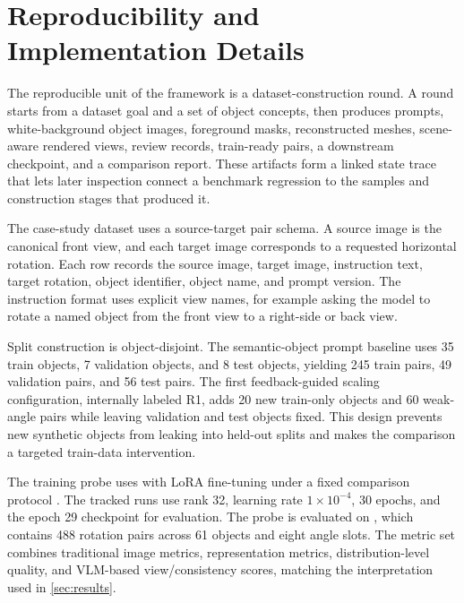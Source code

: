 \section{Reproducibility and Implementation Details}
\label{app:reproducibility}

The reproducible unit of the framework is a dataset-construction round. A round starts from a dataset goal and a set of object concepts, then produces prompts, white-background object images, foreground masks, reconstructed meshes, scene-aware rendered views, review records, train-ready pairs, a downstream checkpoint, and a comparison report. These artifacts form a linked state trace that lets later inspection connect a benchmark regression to the samples and construction stages that produced it.

The case-study dataset uses a source-target pair schema. A source image is the canonical front view, and each target image corresponds to a requested horizontal rotation. Each row records the source image, target image, instruction text, target rotation, object identifier, object name, and prompt version. The instruction format uses explicit view names, for example asking the model to rotate a named object from the front view to a right-side or back view.

Split construction is object-disjoint. The semantic-object prompt baseline uses 35 train objects, 7 validation objects, and 8 test objects, yielding 245 train pairs, 49 validation pairs, and 56 test pairs. The first feedback-guided scaling configuration, internally labeled R1, adds 20 new train-only objects and 60 weak-angle pairs while leaving validation and test objects fixed. This design prevents new synthetic objects from leaking into held-out splits and makes the comparison a targeted train-data intervention.

The training probe uses \qwenedit{} with LoRA fine-tuning under a fixed comparison protocol \cite{hu2021lora,wu2025qwenimage,qwen2025qwenimageedit2511}. The tracked runs use rank 32, learning rate \(1\times10^{-4}\), 30 epochs, and the epoch 29 checkpoint for evaluation. The probe is evaluated on \spatialedit{} \cite{xiao2026spatialedit}, which contains 488 rotation pairs across 61 objects and eight angle slots. The metric set combines traditional image metrics, representation metrics, distribution-level quality, and VLM-based view/consistency scores, matching the interpretation used in \cref{sec:results}.

\begin{table}[t]
\centering
\small
\caption{Render-quality diagnosis for the first feedback-guided scaling round, used to route the round to \inspect{}.}
\label{tab:r1-quality-diagnosis}

\end{table}

